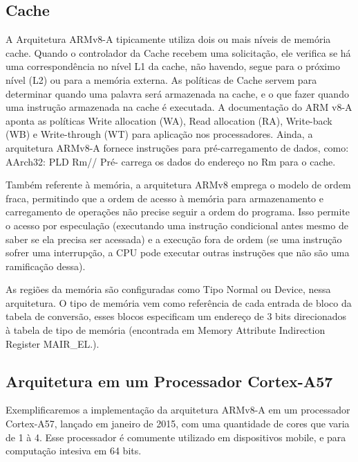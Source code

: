 \documentclass[12pt,a4paper,utf8]{ppgsi}
\begin{document}
        \subsection{Cache}
        A Arquitetura ARMv8-A tipicamente utiliza dois ou mais níveis de memória cache. Quando o controlador da Cache recebem uma solicitação, ele verifica se há uma correspondência no nível L1 da cache, não havendo, segue para o próximo nível (L2) ou para a memória externa.
        As políticas de Cache servem para determinar quando uma palavra será armazenada na cache, e o que fazer quando uma instrução armazenada na cache é executada. A documentação do ARM v8-A aponta as políticas Write allocation (WA), Read allocation (RA), Write-back (WB) e Write-through (WT) para aplicação nos processadores. Ainda, a arquitetura ARMv8-A fornece instruções para pré-carregamento de dados, como: AArch32: PLD Rm// Pré- carrega os dados do endereço no Rm para o cache.
        
        Também referente à memória, a arquitetura ARMv8 emprega o modelo de ordem fraca, permitindo que a ordem de acesso à memória para armazenamento e carregamento de operações não precise seguir a ordem do programa. Isso permite o acesso por especulação (executando uma instrução condicional antes mesmo de saber se ela precisa ser acessada) e a execução fora de ordem (se uma instrução sofrer uma interrupção, a CPU pode executar outras instruções que não são uma ramificação dessa). 
        
        As regiões da memória são configuradas como Tipo Normal ou Device, nessa arquitetura. O tipo de memória vem como referência de cada entrada de bloco da tabela de conversão, esses blocos especificam um endereço de 3 bits direcionados à tabela de tipo de memória (encontrada em Memory Attribute Indirection Register MAIR_EL.).

    \subsection{Arquitetura em um Processador Cortex-A57}
        Exemplificaremos a implementação da arquitetura ARMv8-A em um processador Cortex-A57, lançado em janeiro de 2015, com uma quantidade de cores que varia de 1 à 4.
        Esse processador é comumente utilizado em dispositivos mobile, e para computação intesiva em 64 bits.
        
\end{document}

